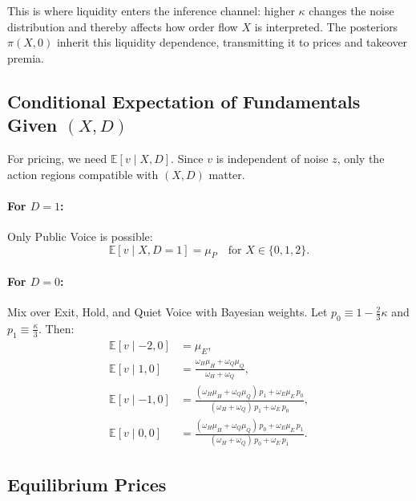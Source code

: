 \documentclass[11pt]{article}
\newcommand{\E}{\mathbb{E}}
\newcommand{\1}{\mathbf{1}}
\begin{document}
This is where liquidity enters the inference channel: higher $\kappa$ changes the noise distribution and thereby affects how order flow $X$ is interpreted. The posteriors $\pi(X,0)$ inherit this liquidity dependence, transmitting it to prices and takeover premia.

%
\subsection{Conditional Expectation of Fundamentals Given \texorpdfstring{$(X,D)$}{(X,D)}}
%

For pricing, we need $\E[v \mid X, D]$. Since $v$ is independent of noise $z$, only the action regions compatible with $(X, D)$ matter.

\paragraph{For $D=1$:} Only Public Voice is possible:
\[
\E[v \mid X, D=1] = \mu_P \quad \text{for } X \in \{0, 1, 2\}.
\]

\paragraph{For $D=0$:} Mix over Exit, Hold, and Quiet Voice with Bayesian weights. Let $p_0 \equiv 1 - \frac{2}{3}\kappa$ and $p_1 \equiv \frac{\kappa}{3}$. Then:
\begin{align*}
\E[v \mid -2, 0] &= \mu_E, \\
\E[v \mid 1, 0] &= \frac{\omega_H \mu_H + \omega_Q \mu_Q}{\omega_H + \omega_Q}, \\
\E[v \mid -1, 0] &= \frac{(\omega_H \mu_H + \omega_Q \mu_Q) \, p_1 + \omega_E \mu_E \, p_0}{(\omega_H + \omega_Q) \, p_1 + \omega_E \, p_0}, \\
\E[v \mid 0, 0] &= \frac{(\omega_H \mu_H + \omega_Q \mu_Q) \, p_0 + \omega_E \mu_E \, p_1}{(\omega_H + \omega_Q) \, p_0 + \omega_E \, p_1}.
\end{align*}

%
\subsection{Equilibrium Prices}
\label{sec:prices}
\end{document}
